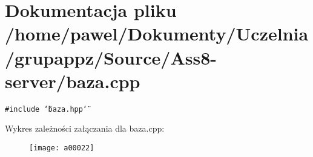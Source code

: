 \hypertarget{a00003}{
\section{Dokumentacja pliku /home/pawel/Dokumenty/Uczelnia/grupappz/Source/Ass8-server/baza.cpp}
\label{a00003}
}
{\tt \#include \char`\"{}baza.hpp\char`\"{}}\par


Wykres zależności załączania dla baza.cpp:\nopagebreak
\begin{figure}[H]
\begin{center}
\leavevmode
\texttt{[image: a00022]}
\end{center}
\end{figure}
